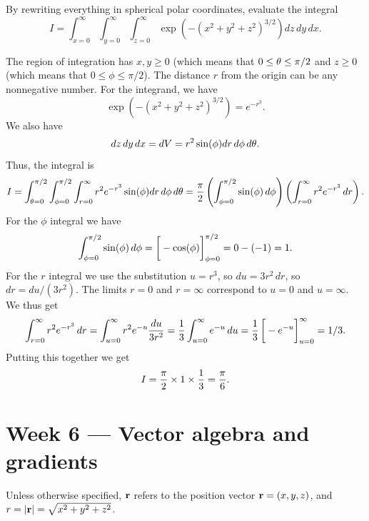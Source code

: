 \documentclass[a4paper]{amsart}
\renewenvironment{solution}{\SolutionInline}{\endSolutionInline}
\begin{document}
\begin{exercise}
 By rewriting everything in spherical polar coordinates, evaluate the
 integral 
 \[ I = \int_{x=0}^\infty \int_{y=0}^\infty \int_{z=0}^\infty 
         \exp\left(-(x^2+y^2+z^2)^{3/2}\right) dz\,dy\,dx.
 \]
\end{exercise}
\begin{solution}
 The region of integration has $x,y\geq 0$ (which means that
 $0\leq\theta\leq\pi/2$ and $z\geq 0$ (which means that
 $0\leq\phi\leq\pi/2$).  The distance $r$ from the origin can be any
 nonnegative number.  For the integrand, we have 
 \[ \exp\left(-(x^2+y^2+z^2)^{3/2}\right) = e^{-r^3}. \]
 We also have 
 \[ dz\,dy\,dx = dV = r^2\sin(\phi) dr\,d\phi\,d\theta. \]
 Thus, the integral is 
 \[ I =
      \int_{\theta=0}^{\pi/2} \int_{\phi=0}^{\pi/2} \int_{r=0}^\infty
        r^2 e^{-r^3} \sin(\phi) dr\,d\phi\,d\theta = 
      \frac{\pi}{2}
      \left(\int_{\phi=0}^{\pi/2}\sin(\phi)\,d\phi \right)
      \left(\int_{r=0}^\infty r^2 e^{-r^3}\,dr\right).
 \]
 For the $\phi$ integral we have
 \[ \int_{\phi=0}^{\pi/2}\sin(\phi)\,d\phi = 
     \CH{-\cos(\phi)}_{\phi=0}^{\pi/2} = 0 - (-1) = 1.
 \]
 For the $r$ integral we use the substitution $u=r^3$, so
 $du=3r^2\,dr$, so $dr=du/(3r^2)$.  The limits $r=0$ and $r=\infty$
 correspond to $u=0$ and $u=\infty$.  We thus get 
 \[ \int_{r=0}^\infty r^2 e^{-r^3}\,dr = 
    \int_{u=0}^\infty r^2 e^{-u} \frac{du}{3r^2} = 
    \frac{1}{3}\int_{u=0}^\infty e^{-u}\,du = 
    \frac{1}{3}\CH{-e^{-u}}_{u=0}^\infty = 1/3.
 \]
 Putting this together we get
 \[ I = \frac{\pi}{2} \times 1 \times \frac{1}{3} = \frac{\pi}{6}. \]
\end{solution}

\section*{Week 6 --- Vector algebra and gradients}

Unless otherwise specified, $\mathbf{r}$ refers to the position vector
$\mathbf{r}=(x,y,z)$, and $r=|\mathbf{r}|=\sqrt{x^2+y^2+z^2}$.
\end{document}
